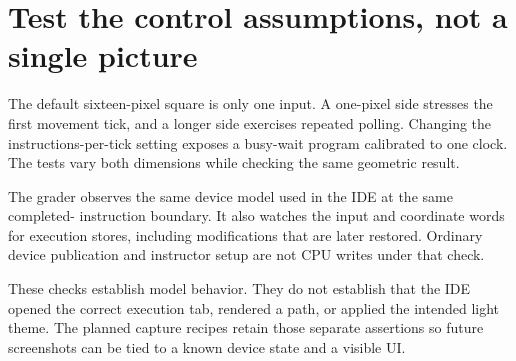 \section{Test the control assumptions, not a single
  picture}\label{006-marsbot-square-p11-test-the-control-assumptions-not-a-single-picture}

The default sixteen-pixel square is only one input. A one-pixel side
stresses the first movement tick, and a longer side exercises repeated
polling. Changing the instructions-per-tick setting exposes a busy-wait
program calibrated to one clock. The tests vary both dimensions while
checking the same geometric result.

The grader observes the same device model used in the IDE at the same
completed- instruction boundary. It also watches the input and
coordinate words for execution stores, including modifications that are
later restored. Ordinary device publication and instructor setup are not
CPU writes under that check.

These checks establish model behavior. They do not establish that the
IDE opened the correct execution tab, rendered a path, or applied the
intended light theme. The planned capture recipes retain those separate
assertions so future screenshots can be tied to a known device state and
a visible UI.
